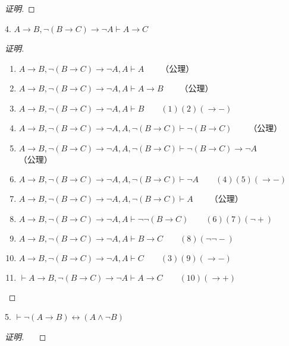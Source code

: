 \documentclass{article}
\begin{document}
\begin{CJK*}{UTF8}{gbsn}
\begin{proof}[证明]
    \end{proof}
    
    4. $A\to B, \lnot(B\to C)\to \lnot A\vdash A\to C$
    
    \begin{proof}[证明]
      
      $\quad$

      \begin{enumerate}
        \item $A\to B, \lnot(B\to C)\to \lnot A, A\vdash A\qquad$（公理）
        \item $A\to B, \lnot(B\to C)\to \lnot A, A\vdash A\to B\qquad$（公理）
        \item $A\to B, \lnot(B\to C)\to \lnot A, A\vdash B\qquad(1)(2)(\to -)$
        \item $A\to B, \lnot(B\to C)\to \lnot A, A, \lnot(B\to C)\vdash \lnot(B\to C)\qquad$（公理）
        \item $A\to B, \lnot(B\to C)\to \lnot A, A, \lnot(B\to C)\vdash \lnot(B\to C)\to \lnot A\qquad$（公理）
        \item $A\to B, \lnot(B\to C)\to \lnot A, A, \lnot(B\to C)\vdash \lnot A\qquad(4)(5)(\to -)$
        \item $A\to B, \lnot(B\to C)\to \lnot A, A, \lnot(B\to C)\vdash A\qquad$（公理）
        \item $A\to B, \lnot(B\to C)\to \lnot A, A\vdash \lnot\lnot(B\to C)\qquad(6)(7)(\lnot +)$
        \item $A\to B, \lnot(B\to C)\to \lnot A, A\vdash B\to C\qquad(8)(\lnot\lnot -)$
        \item $A\to B, \lnot(B\to C)\to \lnot A, A\vdash C\qquad(3)(9)(\to -)$
        \item $\vdash A\to B, \lnot(B\to C)\to \lnot A\vdash A\to C\qquad(10)(\to +)$
      \end{enumerate}

    \end{proof}
    
    5. $\vdash \lnot (A\to B)\leftrightarrow (A\land \lnot B)$
    
    \begin{proof}[证明]
      
      $\quad$


\end{proof}
\end{CJK*}
\end{document}
